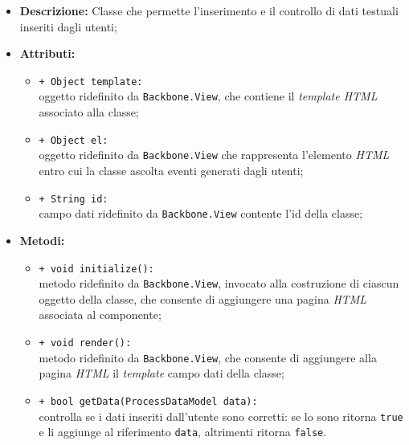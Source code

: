 \begin{flushleft}
\begin{itemize}
\item \textbf{Descrizione:} Classe che permette l'inserimento e il controllo di dati testuali inseriti dagli utenti;
\item \textbf{Attributi:}
\begin{sloppypar}
\begin{itemize}
\item \texttt{+ Object template:}\\ oggetto ridefinito da \texttt{Backbone.View}, che contiene il \textit{template HTML} associato alla classe;
\item \texttt{+ Object el:}\\ oggetto ridefinito da \texttt{Backbone.View} che rappresenta l'elemento \textit{HTML} entro cui la classe ascolta eventi generati dagli utenti;
\item \texttt{+ String id:}\\ campo dati ridefinito da \texttt{Backbone.View} contente l'id della classe;
\end{itemize}
\end{sloppypar}
\item \textbf{Metodi:}
\begin{sloppypar}
\begin{itemize}
\item \texttt{+ void initialize():}\\ metodo ridefinito da \texttt{Backbone.View}, invocato alla costruzione di ciascun oggetto della classe, che consente di aggiungere una pagina \textit{HTML} associata al componente;
\item \texttt{+ void render():}\\ metodo ridefinito da \texttt{Backbone.View}, che consente di aggiungere alla pagina \textit{HTML} il \textit{template} campo dati della classe;
\item \texttt{+ bool getData(ProcessDataModel data):}\\ controlla se i dati inseriti dall'utente sono corretti: se lo sono ritorna \texttt{true} e li aggiunge al riferimento \texttt{data}, altrimenti ritorna \texttt{false}.
\end{itemize}
\end{sloppypar}
\end{itemize}
\end{flushleft}

